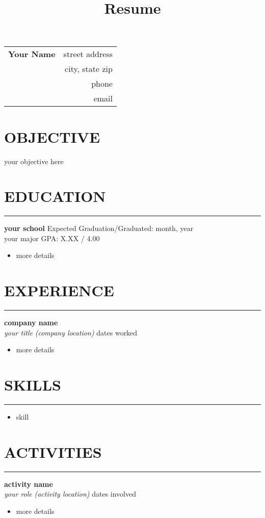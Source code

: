 \documentclass[10pt,letterpaper]{article}
\title{Resume}
\author{\name}
\date{}
\newcommand{\objectivewidth}{0.18\textwidth}%
\newcommand{\GapOne}{12pt}%
\newcommand{\GapTwo}{6pt}%
\newcommand{\sect}[1]%
	{
	\section{{#1}}
	\hrule
	}
\newcommand{\sectlist}[1]%
	{
	\section{{#1}}
	\hrule
	\vspace{\GapTwo}%
	}
\newcommand{\school}[4]%
	{
	\vspace{\GapTwo}%
	\textbf{{#1}} \hfill {#3}\\%
	{#2} \hfill {#4}%
	}
\newcommand{\entry}[4]%
	{
	\vspace{\GapTwo}%
	\textbf{{#1}}\\%
	\textit{#2} \textit{(#3)} \hfill {#4}%
	}
\newcommand{\name}{Your Name}
\newcommand{\addressone}{street address}
\newcommand{\addresstwo}{city, state zip}
\newcommand{\phone}{phone}
\newcommand{\email}{email}
\newlength{\shiftdown}
\begin{document}
\begin{table}
\begin{tabularx}{\hsize}[t]{@{}Xr@{}}
\multirow{1}{*}[\shiftdown]{\Huge\bfseries \name} & \addressone \\
& \addresstwo \\
& \phone \\
& \email
\end{tabularx}
\end{table}


\begin{minipage}{\objectivewidth}
	\section{OBJECTIVE}
\end{minipage}
\hfill
\begin{minipage}{\textwidth - \objectivewidth}
	\vspace{\GapOne}
	your objective here
	\vspace{\GapOne}
\end{minipage}


\sect{EDUCATION}

\school{your school}
{your major}
{Expected Graduation/Graduated: month, year}
{GPA: X.XX / 4.00}
\begin{itemize}
\item more details
\end{itemize}


\sect{EXPERIENCE}

\entry{company name}
{your title}
{company location}
{dates worked}
\begin{itemize}
\item more details
\end{itemize}


\sectlist{SKILLS}

\begin{itemize}
\item skill
\end{itemize}


\sect{ACTIVITIES}

\entry{activity name}
{your role}
{activity location}
{dates involved}
\begin{itemize}
\item more details
\end{itemize}
\end{document}

